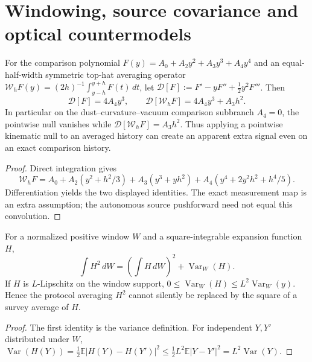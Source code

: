 \documentclass[12pt,a4paper]{article}
\begin{document}
\section{Windowing, source covariance and optical countermodels}
\label{p6c:sec:v358-window-optical-technical}
\begin{proposition}
\label{p6c:prop:v358-window-null-contamination}
For the comparison polynomial
$F(y)=A_0+A_2y^2+A_3y^3+A_4y^4$ and an equal-half-width
symmetric top-hat averaging operator
$\mathcal W_hF(y)=(2h)^{-1}\int_{y-h}^{y+h}F(t)\,dt$,
let
$\mathscr D[F]:=F'-yF''+\frac12y^2F'''$.  Then
\[
 \mathscr D[F]=4A_4y^3,\qquad
 \mathscr D[\mathcal W_hF]=4A_4y^3+A_3h^2.
\]
In particular on the dust--curvature--vacuum comparison subbranch
$A_4=0$, the pointwise null vanishes while
$\mathscr D[\mathcal W_hF]=A_3h^2$.  Thus applying a pointwise
kinematic null to an averaged history can create an apparent extra
signal even on an exact comparison history.
\end{proposition}
\begin{proof}
Direct integration gives
\[
 \mathcal W_hF=A_0+A_2(y^2+h^2/3)
 +A_3(y^3+yh^2)+A_4(y^4+2y^2h^2+h^4/5).
\]
Differentiation yields the two displayed identities.  The exact
measurement map is an extra assumption; the autonomous source
pushforward need not equal this convolution.
\end{proof}

\begin{proposition}
\label{p6c:prop:v358-mean-square-window}
For a normalized positive window $W$ and a square-integrable
expansion function $H$,
\[
 \int H^2\,dW=\left(\int H\,dW\right)^2
   +\operatorname{Var}_W(H).
\]
If $H$ is $L$-Lipschitz on the window support,
$0\le\operatorname{Var}_W(H)\le L^2\operatorname{Var}_W(y)$.
Hence the protocol averaging $H^2$ cannot silently be replaced by
the square of a survey average of $H$.
\end{proposition}
\begin{proof}
The first identity is the variance definition.  For independent
$Y,Y'$ distributed under $W$,
$\operatorname{Var}(H(Y))=\frac12\mathbb E
|H(Y)-H(Y')|^2\le\frac12L^2\mathbb E|Y-Y'|^2
=L^2\operatorname{Var}(Y)$.
\end{proof}
\end{document}
